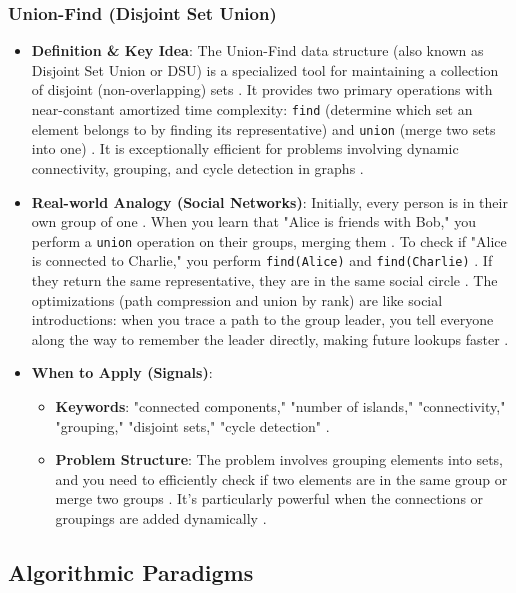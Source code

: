 \documentclass{article}
\begin{document}
\subsubsection{Union-Find (Disjoint Set Union)}
\begin{itemize}
\item \textbf{Definition \& Key Idea}: The Union-Find data structure (also known as Disjoint Set Union or DSU) is a specialized tool for maintaining a collection of disjoint (non-overlapping) sets \cite{372, 373}. It provides two primary operations with near-constant amortized time complexity: \texttt{find} (determine which set an element belongs to by finding its representative) and \texttt{union} (merge two sets into one) \cite{374}. It is exceptionally efficient for problems involving dynamic connectivity, grouping, and cycle detection in graphs \cite{375}.
\item \textbf{Real-world Analogy (Social Networks)}: Initially, every person is in their own group of one \cite{377}. When you learn that "Alice is friends with Bob," you perform a \texttt{union} operation on their groups, merging them \cite{377}. To check if "Alice is connected to Charlie," you perform \texttt{find(Alice)} and \texttt{find(Charlie)} \cite{378}. If they return the same representative, they are in the same social circle \cite{379}. The optimizations (path compression and union by rank) are like social introductions: when you trace a path to the group leader, you tell everyone along the way to remember the leader directly, making future lookups faster \cite{380}.
\item \textbf{When to Apply (Signals)}:
\begin{itemize}
\item \textbf{Keywords}: "connected components," "number of islands," "connectivity," "grouping," "disjoint sets," "cycle detection" \cite{382}.
\item \textbf{Problem Structure}: The problem involves grouping elements into sets, and you need to efficiently check if two elements are in the same group or merge two groups \cite{383}. It's particularly powerful when the connections or groupings are added dynamically \cite{384}.
\end{itemize}
\end{itemize}

\subsection{Algorithmic Paradigms}
\end{document}
